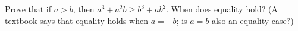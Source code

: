 Prove that if $a>b$, then $a^3+a^2b\ge b^3+ab^2$. When does equality hold? (A textbook says that equality holds when $a=-b$; is $a=b$ also an equality case?)
